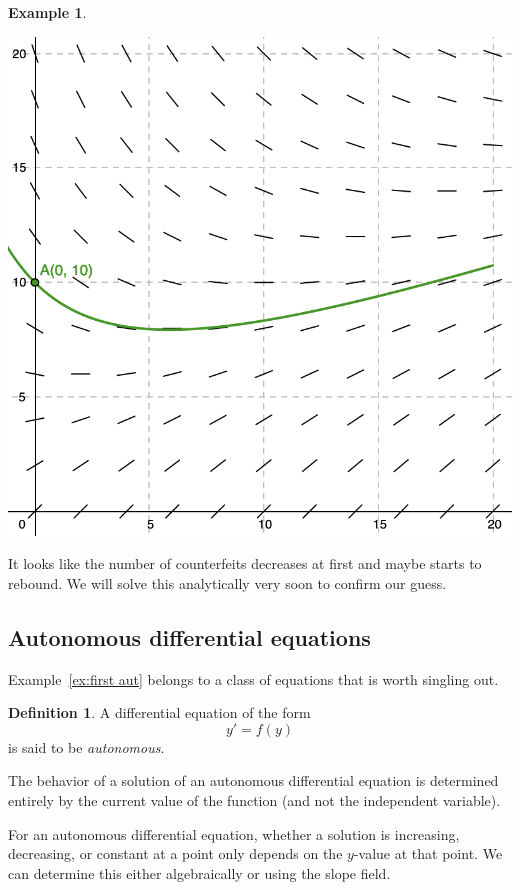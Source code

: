 \documentclass[12pt]{amsart}
\numberwithin{equation}{section}
\theoremstyle{plain} %
\theoremstyle{definition}
\newtheorem{defn}[equation]{Definition}
\newtheorem{ex}[equation]{Example}
\theoremstyle{remark}
\begin{document}
\begin{ex}
\begin{center}\includegraphics[scale=.5]{sf8}\end{center}
It looks like the number of counterfeits decreases at first and maybe starts to rebound. We will solve this analytically very soon to confirm our guess.
\end{ex}




\subsection*{Autonomous differential equations}
Example~\ref{ex:first aut} belongs to a class of equations that is worth singling out.
\begin{defn} A differential equation of the form \[ y' = f(y)\]
 is said to be \emph{autonomous}.
 \end{defn}
 
 The behavior of a solution of an autonomous differential equation is determined entirely by the current value of the function (and not the independent variable).
 
For an autonomous differential equation, whether a solution is increasing, decreasing, or constant at a point only depends on the $y$-value at that point. We can determine this either algebraically or using the slope field.
\end{document}
